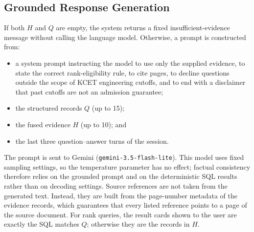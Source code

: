 \documentclass[conference]{IEEEtran}
\begin{document}
\subsection{Grounded Response Generation}
\label{sec:gen}

If both $H$ and $Q$ are empty, the system returns a fixed
insufficient-evidence message without calling the language model.
Otherwise, a prompt is constructed from:

\begin{itemize}
    \item a system prompt instructing the model to use only the
    supplied evidence, to state the correct rank-eligibility rule,
    to cite pages, to decline questions outside the scope of KCET
    engineering cutoffs, and to end with a disclaimer that past
    cutoffs are not an admission guarantee;
    \item the structured records $Q$ (up to 15);
    \item the fused evidence $H$ (up to 10); and
    \item the last three question--answer turns of the session.
\end{itemize}

The prompt is sent to Gemini (\texttt{gemini-3.5-flash-lite}).
This model uses fixed sampling settings, so the temperature
parameter has no effect; factual consistency therefore relies on
the grounded prompt and on the deterministic SQL results rather than
on decoding settings. Source references are not taken from the
generated text. Instead, they are built from the page-number
metadata of the evidence records, which guarantees that every
listed reference points to a page of the source document. For
rank queries, the result cards shown to the user are exactly the
SQL matches $Q$; otherwise they are the records in $H$.
\end{document}
